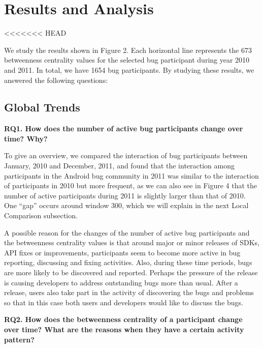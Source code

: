 \documentclass[conference]{IEEEtran}
\begin{document}
\section{Results and Analysis}
\label{results}
<<<<<<< HEAD

We study the results shown in Figure 2. Each horizontal line represents the 673 betweenness
centrality values for the selected bug participant during year 2010 and
2011. In total, we have 1654 bug participants. By studying these results, we answered the
following questions:


\subsection{Global Trends}

\textbf{RQ1. How does the number of active bug participants change over time? Why?}

To give an overview, we compared the interaction of bug participants
between January, 2010 and December, 2011, and found that the
interaction among participants in the Android bug community in 2011 was similar
to the interaction of participants in 2010 but more frequent, as we can also see in Figure 4 that the number of active participants
during 2011 is slightly larger than that of 2010. One
``gap'' occurs around window 300,
which we will explain in the next Local Comparison subsection. 

A possible reason for the changes of the number of active bug participants
and the betweenness centrality values is that around major or minor
releases of SDKs, API fixes or improvements, participants seem to become more
active in bug reporting, discussing and fixing
activities. Also, during these time periods, bugs are more likely to
be discovered and reported. 
Perhaps the pressure of the release is 
causing developers to address outstanding bugs more than usual.
After a
release, users also take part in the activity of
discovering the bugs and problems so that in this case both users and
developers would like to discuss the bugs. 


\textbf{RQ2. How does the betweenness centrality of a participant change over time? What are the reasons when they have a certain activity pattern?}
\end{document}
